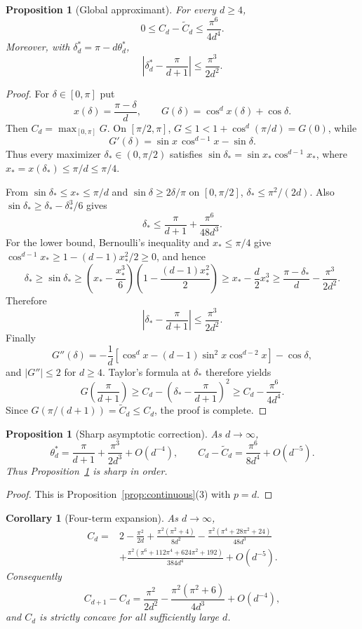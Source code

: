\documentclass[11pt]{article}
\newtheorem{proposition}[theorem]{Proposition}
\newtheorem{corollary}[theorem]{Corollary}
\theoremstyle{definition}\newtheorem{definition}[theorem]{Definition}
\theoremstyle{remark}\newtheorem{remark}[theorem]{Remark}
\begin{document}
\begin{proposition}[Global approximant]\label{prop:globalapprox}
For every $d\ge4$,
\[
0\le C_d-\widetilde C_d\le\frac{\pi^6}{4d^4}.
\]
Moreover, with $\delta_d^*=\pi-d\theta_d^*$,
\[
\left|\delta_d^*-\frac{\pi}{d+1}\right|\le\frac{\pi^3}{2d^2}.
\]
\end{proposition}
\begin{proof}
For $\delta\in[0,\pi]$ put
\[
x(\delta)=\frac{\pi-\delta}{d},\qquad G(\delta)=\cos^d x(\delta)+\cos\delta.
\]
Then $C_d=\max_{[0,\pi]}G$. On $[\pi/2,\pi]$, $G\le1<1+\cos^d(\pi/d)=G(0)$, while
\[
G'(\delta)=\sin x\,\cos^{d-1}x-\sin\delta.
\]
Thus every maximizer $\delta_*\in(0,\pi/2)$ satisfies
$\sin\delta_*=\sin x_*\cos^{d-1}x_*$, where $x_*=x(\delta_*)\le\pi/d\le\pi/4$.

From $\sin\delta_*\le x_*\le\pi/d$ and $\sin\delta\ge2\delta/\pi$ on $[0,\pi/2]$,
$\delta_*\le\pi^2/(2d)$. Also $\sin\delta_*\ge\delta_*-\delta_*^3/6$ gives
\[
\delta_*\le\frac{\pi}{d+1}+\frac{\pi^6}{48d^3}.
\]
For the lower bound, Bernoulli's inequality and $x_*\le\pi/4$ give
$\cos^{d-1}x_*\ge1-(d-1)x_*^2/2\ge0$, and hence
\[
\delta_*\ge\sin\delta_*
\ge\left(x_*-\frac{x_*^3}{6}\right)
      \left(1-\frac{(d-1)x_*^2}{2}\right)
\ge x_*-\frac d2x_*^3
\ge\frac{\pi-\delta_*}{d}-\frac{\pi^3}{2d^2}.
\]
Therefore
\[
\left|\delta_*-\frac{\pi}{d+1}\right|\le\frac{\pi^3}{2d^2}.
\]
Finally
\[
G''(\delta)=-\frac1d\left[\cos^d x-(d-1)\sin^2x\cos^{d-2}x\right]-\cos\delta,
\]
and $|G''|\le2$ for $d\ge4$. Taylor's formula at $\delta_*$ therefore yields
\[
G\!\left(\frac{\pi}{d+1}\right)
\ge C_d-\left(\delta_*-\frac{\pi}{d+1}\right)^2
\ge C_d-\frac{\pi^6}{4d^4}.
\]
Since $G(\pi/(d+1))=\widetilde C_d\le C_d$, the proof is complete.
\end{proof}

\begin{proposition}[Sharp asymptotic correction]\label{prop:approx}
As $d\to\infty$,
\[
\theta_d^*=\frac{\pi}{d+1}+\frac{\pi^3}{2d^3}+O(d^{-4}),
\qquad
\boxed{C_d-\widetilde C_d=\frac{\pi^6}{8d^4}+O(d^{-5}).}
\]
Thus Proposition~\ref{prop:globalapprox} is sharp in order.
\end{proposition}
\begin{proof}
This is Proposition~\ref{prop:continuous}(3) with $p=d$.
\end{proof}

\begin{corollary}[Four-term expansion]\label{cor:asymp}
As $d\to\infty$,
\[
\begin{aligned}
C_d={}&2-\frac{\pi^2}{2d}
+\frac{\pi^2(\pi^2+4)}{8d^2}
-\frac{\pi^2(\pi^4+28\pi^2+24)}{48d^3}\\
&+\frac{\pi^2(\pi^6+112\pi^4+624\pi^2+192)}{384d^4}
+O(d^{-5}).
\end{aligned}
\]
Consequently
\[
C_{d+1}-C_d=\frac{\pi^2}{2d^2}-\frac{\pi^2(\pi^2+6)}{4d^3}+O(d^{-4}),
\]
and $C_d$ is strictly concave for all sufficiently large $d$.
\end{corollary}
\end{document}
